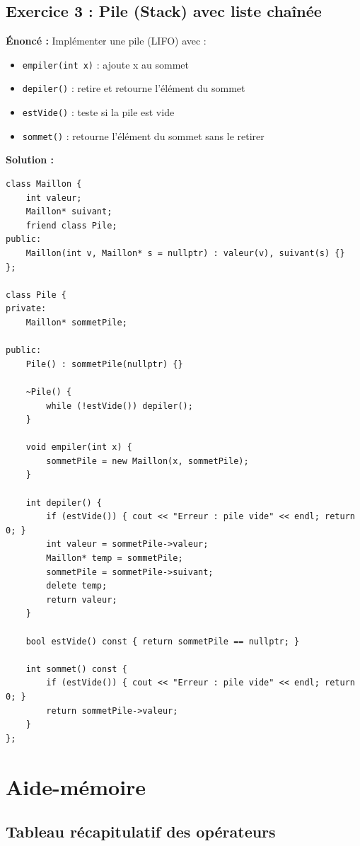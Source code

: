 \documentclass[12pt,a4paper]{article}
\begin{document}
\subsection{Exercice 3 : Pile (Stack) avec liste chaînée}

\textbf{Énoncé :} Implémenter une pile (LIFO) avec :
\begin{itemize}
    \item \texttt{empiler(int x)} : ajoute x au sommet
    \item \texttt{depiler()} : retire et retourne l'élément du sommet
    \item \texttt{estVide()} : teste si la pile est vide
    \item \texttt{sommet()} : retourne l'élément du sommet sans le retirer
\end{itemize}

\textbf{Solution :}

\begin{lstlisting}[style=cpp, caption={Pile.h et Pile.cpp}]
class Maillon {
    int valeur;
    Maillon* suivant;
    friend class Pile;
public:
    Maillon(int v, Maillon* s = nullptr) : valeur(v), suivant(s) {}
};

class Pile {
private:
    Maillon* sommetPile;

public:
    Pile() : sommetPile(nullptr) {}

    ~Pile() {
        while (!estVide()) depiler();
    }

    void empiler(int x) {
        sommetPile = new Maillon(x, sommetPile);
    }

    int depiler() {
        if (estVide()) { cout << "Erreur : pile vide" << endl; return 0; }
        int valeur = sommetPile->valeur;
        Maillon* temp = sommetPile;
        sommetPile = sommetPile->suivant;
        delete temp;
        return valeur;
    }

    bool estVide() const { return sommetPile == nullptr; }

    int sommet() const {
        if (estVide()) { cout << "Erreur : pile vide" << endl; return 0; }
        return sommetPile->valeur;
    }
};
\end{lstlisting}

\section{Aide-mémoire}

\subsection{Tableau récapitulatif des opérateurs}
\end{document}

